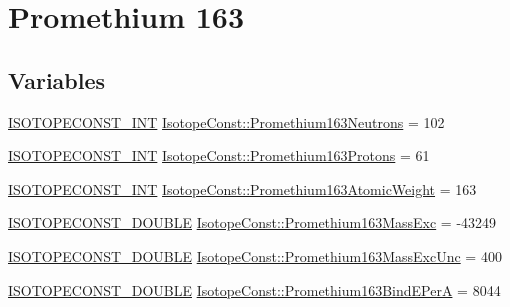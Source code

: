 \hypertarget{group___isotope_const-_promethium-_pm163}{}\section{Promethium 163}
\label{group___isotope_const-_promethium-_pm163}
\subsection*{Variables}
\begin{DoxyCompactItemize}
\item 
\mbox{\hyperlink{group___isotope_const-_macros_ga5f18360b3e99483a35c32d789e62621c}{I\+S\+O\+T\+O\+P\+E\+C\+O\+N\+S\+T\+\_\+\+I\+NT}} \mbox{\hyperlink{group___isotope_const-_promethium-_pm163_ga8e27a2568ab901207991c0d7eef088ca}{Isotope\+Const\+::\+Promethium163\+Neutrons}} = 102
\item 
\mbox{\hyperlink{group___isotope_const-_macros_ga5f18360b3e99483a35c32d789e62621c}{I\+S\+O\+T\+O\+P\+E\+C\+O\+N\+S\+T\+\_\+\+I\+NT}} \mbox{\hyperlink{group___isotope_const-_promethium-_pm163_ga69016f552b3edbe34138cba076a58fd5}{Isotope\+Const\+::\+Promethium163\+Protons}} = 61
\item 
\mbox{\hyperlink{group___isotope_const-_macros_ga5f18360b3e99483a35c32d789e62621c}{I\+S\+O\+T\+O\+P\+E\+C\+O\+N\+S\+T\+\_\+\+I\+NT}} \mbox{\hyperlink{group___isotope_const-_promethium-_pm163_ga9ac426b6eb71174604d41a7e9dd56f98}{Isotope\+Const\+::\+Promethium163\+Atomic\+Weight}} = 163
\item 
\mbox{\hyperlink{group___isotope_const-_macros_ga8f45a7272ce02c0b4c65c44636ed719a}{I\+S\+O\+T\+O\+P\+E\+C\+O\+N\+S\+T\+\_\+\+D\+O\+U\+B\+LE}} \mbox{\hyperlink{group___isotope_const-_promethium-_pm163_gaa4e5662f8c1ab434038a204c0875e365}{Isotope\+Const\+::\+Promethium163\+Mass\+Exc}} = -\/43249
\item 
\mbox{\hyperlink{group___isotope_const-_macros_ga8f45a7272ce02c0b4c65c44636ed719a}{I\+S\+O\+T\+O\+P\+E\+C\+O\+N\+S\+T\+\_\+\+D\+O\+U\+B\+LE}} \mbox{\hyperlink{group___isotope_const-_promethium-_pm163_ga30b8e399d81679a1fd118f25ab713a51}{Isotope\+Const\+::\+Promethium163\+Mass\+Exc\+Unc}} = 400
\item 
\mbox{\hyperlink{group___isotope_const-_macros_ga8f45a7272ce02c0b4c65c44636ed719a}{I\+S\+O\+T\+O\+P\+E\+C\+O\+N\+S\+T\+\_\+\+D\+O\+U\+B\+LE}} \mbox{\hyperlink{group___isotope_const-_promethium-_pm163_ga76386f20e4cf35f62157863f94ac4e61}{Isotope\+Const\+::\+Promethium163\+Bind\+E\+PerA}} = 8044
\item 

\end{DoxyCompactItemize}

